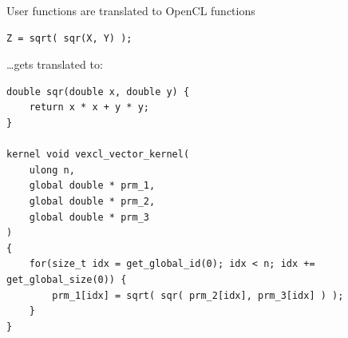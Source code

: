 \documentclass[@BEAMER_OPTIONS@]{beamer}
\begin{document}
\begin{frame}[fragile]{User functions are translated to OpenCL functions}
    \begin{exampleblock}{}
        \begin{lstlisting}
Z = sqrt( sqr(X, Y) );
        \end{lstlisting}
    \end{exampleblock}
    \begin{exampleblock}{\ldots gets translated to:}
        \begin{lstlisting}
double sqr(double x, double y) {
    return x * x + y * y;
}

kernel void vexcl_vector_kernel(
    ulong n,
    global double * prm_1,
    global double * prm_2,
    global double * prm_3
)
{
    for(size_t idx = get_global_id(0); idx < n; idx += get_global_size(0)) {
        prm_1[idx] = sqrt( sqr( prm_2[idx], prm_3[idx] ) );
    }
}
        \end{lstlisting}
    \end{exampleblock}
\end{frame}

\note{ }
\end{document}
